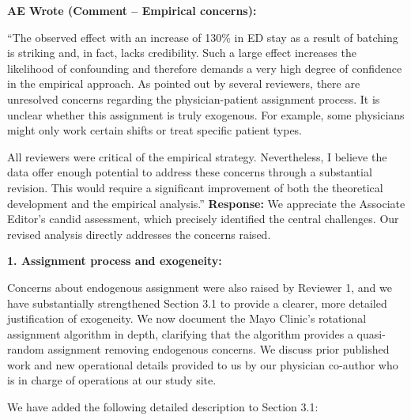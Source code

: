 \documentclass[11pt]{article}
\newenvironment{quote2}
{ \bigskip
\noindent
         \small\em
         \baselineskip=14pt
}
\newcommand{\1}{\hbox{\rm 1\kern-.35em 1}}
\begin{document}
\begin{quote2}
\textbf{AE Wrote (Comment – Empirical concerns):} 

\noindent``The observed effect with an increase of 130\% in ED stay as a result of batching is striking and, in fact, lacks credibility. Such a large effect increases the likelihood of confounding and therefore demands a very high degree of confidence in the empirical approach. As pointed out by several reviewers, there are unresolved concerns regarding the physician-patient assignment process. It is unclear whether this assignment is truly exogenous. For example, some physicians might only work certain shifts or treat specific patient types.

All reviewers were critical of the empirical strategy. Nevertheless, I believe the data offer enough potential to address these concerns through a substantial revision. This would require a significant improvement of both the theoretical development and the empirical analysis.''
\end{quote2}

\noindent\textbf{Response:} \color{blue} We appreciate the Associate Editor's candid assessment, which precisely identified the central challenges. Our revised analysis directly addresses the concerns raised.

\textbf{1. Assignment process and exogeneity:}

Concerns about endogenous assignment were also raised by Reviewer 1, and we have substantially strengthened Section 3.1 to provide a clearer, more detailed justification of exogeneity. We now document the Mayo Clinic’s rotational assignment algorithm in depth, clarifying that the algorithm provides a quasi-random assignment removing endogenous concerns. We discuss prior published work \citep{Traub2016, traub2016emergency, Traub2018} and new operational details provided to us by our physician co-author who is in charge of operations at our study site.

We have added the following detailed description to Section 3.1:
\end{document}
